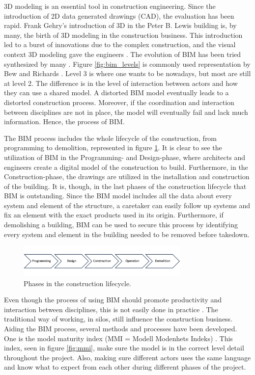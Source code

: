 3D modeling is an essential tool in construction engineering. Since the introduction of 2D data generated drawings (CAD), the evaluation has been rapid. Frank Gehry's introduction of 3D in the Peter B. Lewis building is, by many, the birth of 3D modeling in the construction business. This introduction led to a burst of innovations due to the complex construction, and the visual context 3D modeling gave the engineers \cite{frank_gehry}. The evolution of BIM has been tried synthesized by many \cite{liang2016development}. Figure \ref{fig:bim_levels} is commonly used representation by Bew and Richards \cite{bew2008bim}. Level 3 is where one wants to be nowadays, but most are still at level 2. The difference is in the level of interaction between actors and how they can use a shared model. A distorted BIM model eventually leads to a distorted construction process. Moreover, if the coordination and interaction between disciplines are not in place, the model will eventually fail and lack much information. Hence, the process of BIM. 

The BIM process includes the whole lifecycle of the construction, from programming to demolition, represented in figure \ref{fig:construction_lifecycle}. It is clear to see the utilization of BIM in the Programming- and Design-phase, where architects and engineers create a digital model of the construction to build. Furthermore, in the Construction-phase, the drawings are utilized in the installation and construction of the building.  It is, though, in the last phases of the construction lifecycle that BIM is outstanding. Since the BIM model includes all the data about every system and element of the structure, a caretaker can easily follow up systems and fix an element with the exact products used in its origin. Furthermore, if demolishing a building, BIM can be used to secure this process by identifying every system and element in the building needed to be removed before takedown. 

\begin{figure}
    \centering
    \includegraphics[width=0.75\textwidth]{fig/construction_processes.png}
    \caption{Phases in the construction lifecycle.}
    \label{fig:construction_lifecycle}
\end{figure}

Even though the process of using BIM should promote productivity and interaction between disciplines, this is not easily done in practice \cite{hartmann2012aligning}. The traditional way of working, in silos, still influence the construction business. Aiding the BIM process, several methods and processes have been developed. One is the model maturity index (MMI = Modell Modenhets Indeks) \cite{floisbonn2018mmi}. This index, seen in figure \ref{fig:mmi}, make sure the model is in the correct level detail throughout the project. Also, making sure different actors uses the same language and know what to expect from each other during different phases of the project.

